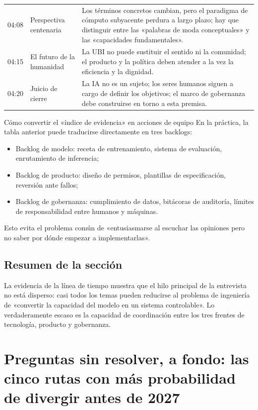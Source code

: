 \documentclass[a4paper]{article}
\begin{document}
\begin{longtable}{p{}p{}p{}}
04:08 & Perspectiva centenaria & Los términos concretos cambian, pero el paradigma de cómputo subyacente perdura a largo plazo; hay que distinguir entre las «palabras de moda conceptuales» y las «capacidades fundamentales». \\
04:15 & El futuro de la humanidad & La UBI no puede sustituir el sentido ni la comunidad; el producto y la política deben atender a la vez la eficiencia y la dignidad. \\
04:20 & Juicio de cierre & La IA no es un sujeto; los seres humanos siguen a cargo de definir los objetivos; el marco de gobernanza debe construirse en torno a esta premisa. \\
\bottomrule
\end{longtable}

\begin{knowledgebox}{Cómo convertir el «índice de evidencia» en acciones de equipo}
En la práctica, la tabla anterior puede traducirse directamente en tres backlogs:
\begin{itemize}[leftmargin=1.5em]
    \item Backlog de modelo: receta de entrenamiento, sistema de evaluación, enrutamiento de inferencia;
    \item Backlog de producto: diseño de permisos, plantillas de especificación, reversión ante fallos;
    \item Backlog de gobernanza: cumplimiento de datos, bitácoras de auditoría, límites de responsabilidad entre humanos y máquinas.
\end{itemize}
Esto evita el problema común de «entusiasmarse al escuchar las opiniones pero no saber por dónde empezar a implementarlas».
\end{knowledgebox}

\subsection{Resumen de la sección}

La evidencia de la línea de tiempo muestra que el hilo principal de la entrevista no está disperso: casi todos los temas pueden reducirse al problema de ingeniería de «convertir la capacidad del modelo en un sistema controlable». Lo verdaderamente escaso es la capacidad de coordinación entre los tres frentes de tecnología, producto y gobernanza.
\section{Preguntas sin resolver, a fondo: las cinco rutas con más probabilidad de divergir antes de 2027}
\end{document}
